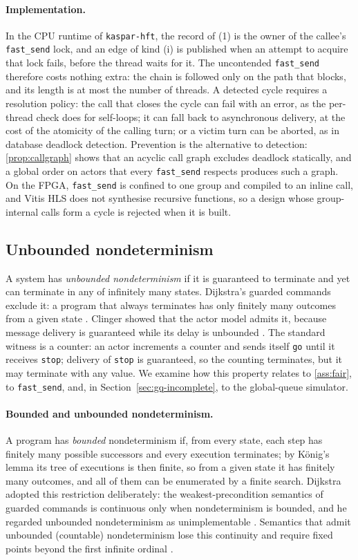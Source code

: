 \documentclass[11pt]{article}
\theoremstyle{definition}
\theoremstyle{remark}
\newcommand{\fs}{\texttt{fast\_send}}
\newcommand{\kh}{\texttt{kaspar-hft}}
\begin{document}
\paragraph{Implementation.} In the CPU runtime of \kh{}, the record of (1) is the owner of
the callee's \fs{} lock, and an edge of kind (i) is published when an attempt to acquire
that lock fails, before the thread waits for it. The uncontended \fs{} therefore costs
nothing extra: the chain is followed only on the path that blocks, and its length is at
most the number of threads. A detected cycle requires a resolution policy: the call
that closes the cycle can fail with an error, as the per-thread check does for
self-loops; it can fall back to asynchronous delivery, at the cost of the atomicity of
the calling turn; or a victim turn can be aborted, as in database deadlock detection.
Prevention is the alternative to detection: \cref{prop:callgraph} shows that an acyclic
call graph excludes deadlock statically, and a global order on actors that every \fs{}
respects produces such a graph. On the FPGA, \fs{} is confined to one group and compiled
to an inline call, and Vitis HLS does not synthesise recursive functions, so a design
whose group-internal calls form a cycle is rejected when it is built.

\subsection{Unbounded nondeterminism}
\label{sec:unbounded}

A system has \emph{unbounded nondeterminism} if it is guaranteed to terminate and yet can
terminate in any of infinitely many states. Dijkstra's guarded commands exclude it: a
program that always terminates has only finitely many outcomes from a given state
\cite{dijkstra1976}. Clinger showed that the actor model admits it, because message
delivery is guaranteed while its delay is unbounded \cite{clinger1981}. The standard
witness is a counter: an actor increments a counter and sends itself \texttt{go} until it
receives \texttt{stop}; delivery of \texttt{stop} is guaranteed, so the counting
terminates, but it may terminate with any value. We examine how this property relates to
\cref{ass:fair}, to \fs{}, and, in Section~\ref{sec:gq-incomplete}, to the global-queue
simulator.

\paragraph{Bounded and unbounded nondeterminism.} A program has \emph{bounded}
nondeterminism if, from every state, each step has finitely many possible successors and
every execution terminates; by K\"onig's lemma its tree of executions is then finite, so
from a given state it has finitely many outcomes, and all of them can be enumerated by a
finite search. Dijkstra adopted this restriction deliberately: the weakest-precondition
semantics of guarded commands is continuous only when nondeterminism is bounded, and he
regarded unbounded nondeterminism as unimplementable \cite{dijkstra1976}. Semantics that
admit unbounded (countable) nondeterminism lose this continuity and require
fixed points beyond the first infinite ordinal \cite{aptplotkin1986}.
\end{document}
